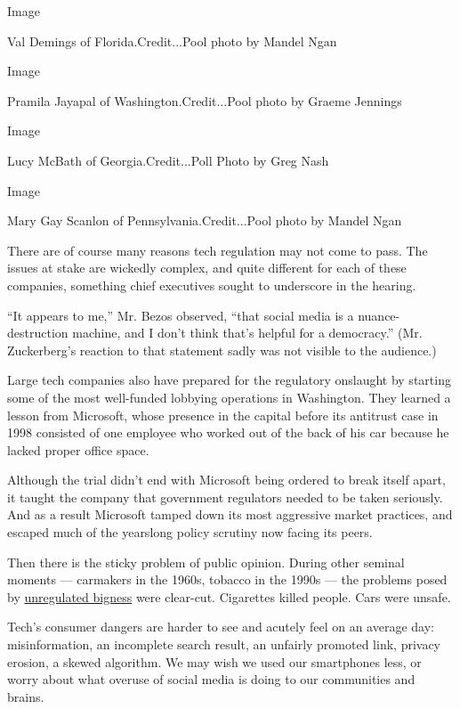 Image

Val Demings of Florida.Credit...Pool photo by Mandel Ngan

Image

Pramila Jayapal of Washington.Credit...Pool photo by Graeme Jennings

Image

Lucy McBath of Georgia.Credit...Poll Photo by Greg Nash

Image

Mary Gay Scanlon of Pennsylvania.Credit...Pool photo by Mandel Ngan

There are of course many reasons tech regulation may not come to pass.
The issues at stake are wickedly complex, and quite different for each
of these companies, something chief executives sought to underscore in
the hearing.

``It appears to me,'' Mr. Bezos observed, ``that social media is a
nuance-destruction machine, and I don't think that's helpful for a
democracy.'' (Mr. Zuckerberg's reaction to that statement sadly was not
visible to the audience.)

Large tech companies also have prepared for the regulatory onslaught by
starting some of the most well-funded lobbying operations in Washington.
They learned a lesson from Microsoft, whose presence in the capital
before its antitrust case in 1998 consisted of one employee who worked
out of the back of his car because he lacked proper office space.

Although the trial didn't end with Microsoft being ordered to break
itself apart, it taught the company that government regulators needed to
be taken seriously. And as a result Microsoft tamped down its most
aggressive market practices, and escaped much of the yearslong policy
scrutiny now facing its peers.

Then there is the sticky problem of public opinion. During other seminal
moments --- carmakers in the 1960s, tobacco in the 1990s --- the
problems posed by
\href{https://www.nytimes3xbfgragh.onion/2018/11/10/opinion/sunday/fascism-economy-monopoly.html}{unregulated
bigness} were clear-cut. Cigarettes killed people. Cars were unsafe.

Tech's consumer dangers are harder to see and acutely feel on an average
day: misinformation, an incomplete search result, an unfairly promoted
link, privacy erosion, a skewed algorithm. We may wish we used our
smartphones less, or worry about what overuse of social media is doing
to our communities and brains.

